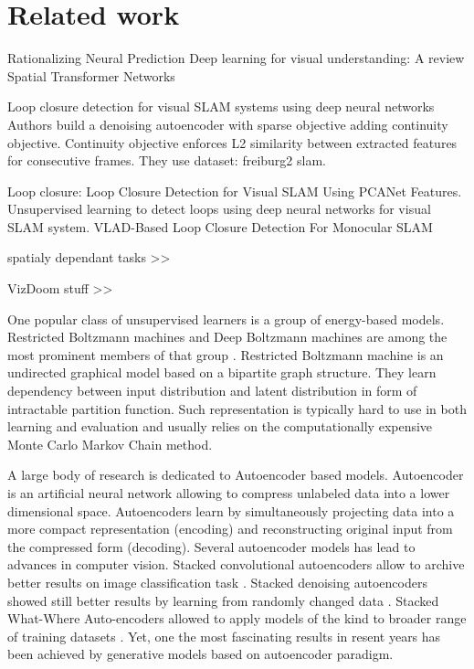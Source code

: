 
\chapter{Related work}

Rationalizing Neural Prediction \cite{Lei2016}
Deep learning for visual understanding: A review \cite{Guo2016}
Spatial Transformer Networks \cite{Jaderberg2015}

Loop closure detection for visual SLAM systems using deep neural networks \cite{Gao2015}
Authors build a denoising autoencoder with sparse objective adding continuity objective.
Continuity objective enforces L2 similarity between extracted features for consecutive frames. They use dataset: freiburg2 slam.

Loop closure:
Loop Closure Detection for Visual SLAM Using PCANet Features.
Unsupervised learning to detect loops using deep neural networks for visual SLAM system.
VLAD-Based Loop Closure Detection For Monocular SLAM \cite{Xia2016, Gao2015a, Huang2016}

spatialy dependant tasks >>

VizDoom stuff >>

One popular class of unsupervised learners is a group of energy-based models.
Restricted Boltzmann machines and Deep Boltzmann machines are among the most prominent members of that group \cite{Ackley1985, Salakhutdinov2009}.
Restricted Boltzmann machine is an undirected graphical model based on a bipartite graph structure.
They learn dependency between input distribution and latent distribution in form of intractable partition function.
Such representation is typically hard to use in both learning and evaluation and usually relies on the computationally expensive Monte Carlo Markov Chain method.


A large body of research is dedicated to Autoencoder based models.
Autoencoder is an artificial neural network allowing to compress unlabeled data into a lower dimensional space.
Autoencoders learn by simultaneously projecting data into a more compact representation (encoding) and reconstructing original input from the compressed form (decoding).
Several autoencoder models has lead to advances in computer vision.
Stacked convolutional autoencoders allow to archive better results on image classification task \cite{Masci2011}. Stacked denoising autoencoders showed still better results by learning from randomly changed data  \cite{Vincent2010}.
Stacked What-Where Auto-encoders allowed to apply models of the kind to broader range of training datasets \cite{Zhao2015}.
Yet, one the most fascinating results in resent years has been achieved by generative models based on autoencoder paradigm.

